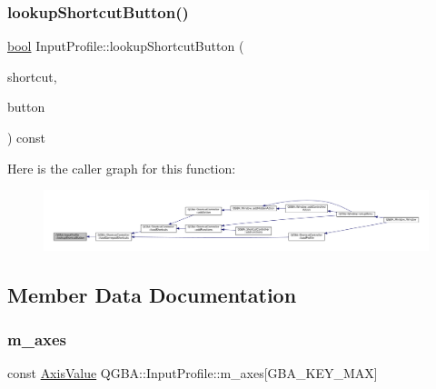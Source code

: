 \subsubsection{\texorpdfstring{lookup\+Shortcut\+Button()}{lookupShortcutButton()}}
{\footnotesize\ttfamily \mbox{\hyperlink{libretro_8h_a4a26dcae73fb7e1528214a068aca317e}{bool}} Input\+Profile\+::lookup\+Shortcut\+Button (\begin{DoxyParamCaption}\item[{const Q\+String \&}]{shortcut,  }\item[{\mbox{\hyperlink{ioapi_8h_a787fa3cf048117ba7123753c1e74fcd6}{int}} $\ast$}]{button }\end{DoxyParamCaption}) const}

Here is the caller graph for this function\+:
\nopagebreak
\begin{figure}[H]
\begin{center}
\leavevmode
\includegraphics[width=350pt]{class_q_g_b_a_1_1_input_profile_aa1db0602f8f404d2f5a6d0ae29445326_icgraph}
\end{center}
\end{figure}


\subsection{Member Data Documentation}
\mbox{\label{class_q_g_b_a_1_1_input_profile_a9ddf4d7f8bcc8915208837d814a052a6}} 
\subsubsection{\texorpdfstring{m\+\_\+axes}{m\_axes}}
{\footnotesize\ttfamily const \mbox{\hyperlink{class_q_g_b_a_1_1_input_profile_struct_q_g_b_a_1_1_input_profile_1_1_axis_value}{Axis\+Value}} Q\+G\+B\+A\+::\+Input\+Profile\+::m\+\_\+axes\mbox{[}G\+B\+A\+\_\+\+K\+E\+Y\+\_\+\+M\+AX\mbox{]}\hspace{0.3cm}{\ttfamily [private]}}

\mbox{\label{class_q_g_b_a_1_1_input_profile_ac7485af5eed8bcb841e4803aa8635b2e}} 

